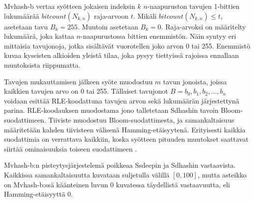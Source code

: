 Mvhash-b vertaa syötteen jokaisen indeksin $k$ $n$-naapuruston
tavujen 1-bittien lukumäärää $bitcount(N_{k,n})$ raja-arvoon $t$.
Mikäli $bitcount(N_{k,n}) \leq t$, asetetaan tavu $B_k = 255$.
Muutoin asetetaan $B_k = 0$. Raja-arvoksi on määritelty lukumäärä,
joka kattaa $n$-naapurustossa bittien enemmistön. Näin syntyy
eri mittaisia tavujonoja, jotka sisältävät vuorotellen
joko arvon 0 tai 255. Enemmistö kuvaa kyseisten alkioiden
yleistä tilaa, joka pysyy tiettyissä rajoissa ennallaan
muutoksista riippumatta.

Tavujen mukauttamisen jälkeen syöte muodostuu $m$ tavun jonoista,
joissa kaikkien tavujen arvo on 0 tai 255. Tällaiset tavujonot
$B = b_0, b_1,b_2, \dots, b_n$ voidaan esittää RLE-koodattuna
tavujen arvon sekä lukumäärän järjestettynä parina. RLE-koodauksen
muodostama jono talletetaan Sdhashin tavoin Bloom-suodattimeen.
Tiiviste muodostuu Bloom-suodattimesta, ja samankaltaisuus
määritetään kahden tiivisteen välisenä Hamming-etäisyytenä.
Erityisesti kaikkia suodattimia on verrattava kaikkiin,
koska syötteen pituuden muutokset saattavat siirtää
ominaisuuksia toiseen suodattimeen \parencite{breitinger13}.

Mvhash-b:n pisteytysjärjestelemä poikkeaa Ssdeepin ja Sdhashin
vastaavista. Kaikkissa samankaltaisuutta kuvataan suljetulla
välillä $[0, 100]$, mutta asteikko on Mvhash-b:ssä käänteinen
luvun 0 kuvatessa täydellistä vastaavuutta, eli Hamming-etäisyyttä 0.
